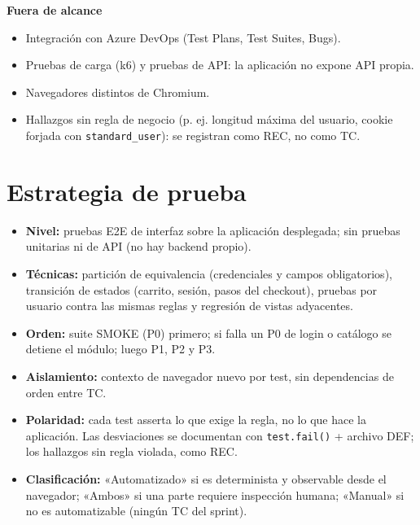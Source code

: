 \documentclass[10pt,a4paper]{article}
\begin{document}
\textbf{Fuera de alcance}
\begin{itemize}
  \item Integración con Azure DevOps (Test Plans, Test Suites, Bugs).
  \item Pruebas de carga (k6) y pruebas de API: la aplicación no expone API propia.
  \item Navegadores distintos de Chromium.
  \item Hallazgos sin regla de negocio (p. ej. longitud máxima del usuario, cookie forjada con \texttt{standard\_user}): se registran como REC, no como TC.
\end{itemize}

\section{Estrategia de prueba}
\begin{itemize}
  \item \textbf{Nivel:} pruebas E2E de interfaz sobre la aplicación desplegada; sin pruebas unitarias ni de API (no hay backend propio).
  \item \textbf{Técnicas:} partición de equivalencia (credenciales y campos obligatorios), transición de estados (carrito, sesión, pasos del checkout), pruebas por usuario contra las mismas reglas y regresión de vistas adyacentes.
  \item \textbf{Orden:} suite SMOKE (P0) primero; si falla un P0 de login o catálogo se detiene el módulo; luego P1, P2 y P3.
  \item \textbf{Aislamiento:} contexto de navegador nuevo por test, sin dependencias de orden entre TC.
  \item \textbf{Polaridad:} cada test asserta lo que exige la regla, no lo que hace la aplicación. Las desviaciones se documentan con \texttt{test.fail()} + archivo DEF; los hallazgos sin regla violada, como REC.
  \item \textbf{Clasificación:} «Automatizado» si es determinista y observable desde el navegador; «Ambos» si una parte requiere inspección humana; «Manual» si no es automatizable (ningún TC del sprint).
\end{itemize}
\end{document}
